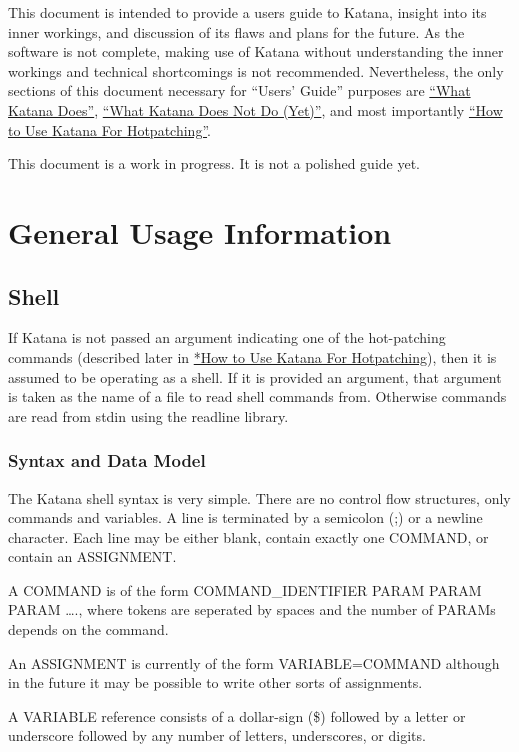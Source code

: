 \documentclass[11pt]{article}
\begin{document}
  This document is intended to provide a users guide to Katana,
  insight into its inner workings, and discussion of its flaws and
  plans for the future. As the software is not complete, making use of
  Katana without understanding the inner workings and technical
  shortcomings is not recommended. Nevertheless, the only sections of
  this document necessary for ``Users' Guide'' purposes are 
  \hyperref[sec-3.2]{``What Katana Does''}, \hyperref[sec-3.3]{``What Katana Does Not Do (Yet)''}, and most importantly 
  \hyperref[sec-3.5]{``How to Use Katana For Hotpatching''}.
 
  This document is a work in progress. It is not a polished guide yet.

\section{General Usage Information}
\label{sec-2}

\subsection{Shell}
\label{sec-2.1}

   If Katana is not passed an argument indicating one of the
   hot-patching commands (described later in  \hyperref[sec-3.5]{*How to Use Katana For Hotpatching}), then it is assumed to be operating as a shell. If it
   is provided an argument, that argument is taken as the name of a
   file to read shell commands from. Otherwise commands are read from
   stdin using the readline library. 
\subsubsection{Syntax and Data Model}
\label{sec-2.1.1}

    The Katana shell syntax is very simple. There are no control flow
    structures, only commands and variables. A line is terminated by a
    semicolon (;) or a newline character. Each line may be either
    blank, contain exactly one COMMAND, or contain an ASSIGNMENT.

    A COMMAND is of the form COMMAND\_{}IDENTIFIER PARAM PARAM PARAM \ldots{}., where
    tokens are seperated by spaces and the number of PARAMs depends on
    the command.

    An ASSIGNMENT is currently of the form VARIABLE=COMMAND although
    in the future it may be possible to write other sorts of
    assignments.

    A VARIABLE reference consists of a dollar-sign (\$) followed by a
    letter or underscore followed by any number of letters,
    underscores, or digits.
\end{document}

